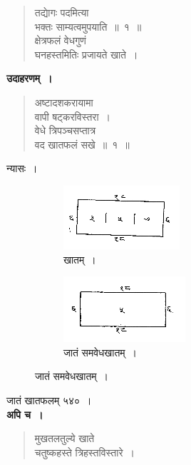 \documentclass[11pt, openany]{book}
\begin{document}
\newpage%

\begin{quote}
    \bs 
तद्याेगः पदमित्या\\
भक्तः साम्यत्वमुपयाति~॥~१~॥~\\
क्षेत्रफलं वेधगुणं\\
घनहस्तमितिः प्रजायते खाते~। 
\end{quote}

\textbf{उदाहरणम्~।} 
\begin{quote}
    \bqt 
    अष्टादशकरायामा\\
वापी षट्करविस्तरा~। \\
वेधे त्रिपञ्चसप्तात्र\\
वद खातफलं सखे~॥~१~॥~
\end{quote}

न्यासः~। 

\begin{figure}[h!]
     \centering
     \begin{subfigure}[b]{0.45\textwidth}
         \centering
         \captionsetup{labelformat=empty}
          \caption{खातम्~।}
\vspace{-2mm}
         \includegraphics[scale=0.85]{graphics/capture187.png}
     \end{subfigure}
     \hfill
     \begin{subfigure}[b]{0.45\textwidth}
         \centering
         \captionsetup{labelformat=empty}
          \caption{जातं समवेधखातम्~।}
\vspace{-2mm}
         \includegraphics[scale=0.85]{graphics/capture187'.png}
     \end{subfigure}
\end{figure}
\vspace{-3mm}

जातं खातफलम् ५४०~।\\

\textbf{अपि च~।} 
\begin{quote}
    \bqt 
    मुखतलतुल्ये खाते\\
चतुष्कहस्ते त्रिहस्तविस्तारे~। 
\end{quote}
 
\end{document}
